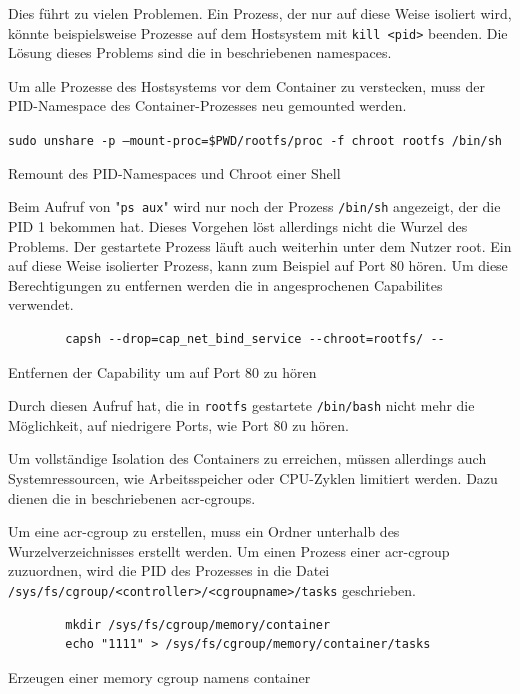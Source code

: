 Dies führt zu vielen Problemen. Ein Prozess, der nur auf diese Weise isoliert wird, könnte beispielsweise Prozesse auf dem Hostsystem mit \texttt{kill <pid>} beenden. Die Lösung dieses Problems sind die in  beschriebenen namespaces.

Um alle Prozesse des Hostsystems vor dem Container zu verstecken, muss der PID-Namespace des Container-Prozesses neu gemounted werden.
\begin{listing}[h]
	\texttt{sudo unshare -p --mount-proc=\$PWD/rootfs/proc -f chroot rootfs /bin/sh}
	\caption{Remount des PID-Namespaces und Chroot einer Shell}
\end{listing}

Beim Aufruf von "\texttt{ps aux}" wird nur noch der Prozess \texttt{/bin/sh} angezeigt, der die PID 1 bekommen hat. Dieses Vorgehen löst allerdings nicht die Wurzel des Problems. Der gestartete Prozess läuft auch weiterhin unter dem Nutzer root. Ein auf diese Weise isolierter Prozess, kann zum Beispiel auf Port 80 hören. Um diese Berechtigungen zu entfernen werden die in  angesprochenen Capabilites verwendet.

\begin{listing}
	\begin{verbatim}
		capsh --drop=cap_net_bind_service --chroot=rootfs/ --
	\end{verbatim}
	\caption{Entfernen der Capability um auf Port 80 zu hören}
\end{listing}

Durch diesen Aufruf hat, die in \texttt{rootfs} gestartete \texttt{/bin/bash} nicht mehr die Möglichkeit, auf niedrigere Ports, wie Port 80 zu hören.

Um vollständige Isolation des Containers zu erreichen, müssen allerdings auch Systemressourcen, wie Arbeitsspeicher oder CPU-Zyklen limitiert werden. Dazu dienen die in  beschriebenen \glspl{acr-cgroup}.

Um eine \gls{acr-cgroup} zu erstellen, muss ein Ordner unterhalb des Wurzelverzeichnisses erstellt werden. Um einen Prozess einer \gls{acr-cgroup} zuzuordnen, wird die PID des Prozesses in die Datei \texttt{/sys/fs/cgroup/<controller>/<cgroupname>/tasks} geschrieben.

\begin{listing}[h]
	\begin{verbatim}
		mkdir /sys/fs/cgroup/memory/container
		echo "1111" > /sys/fs/cgroup/memory/container/tasks
	\end{verbatim}
	\caption{Erzeugen einer memory cgroup namens container}
\end{listing}

